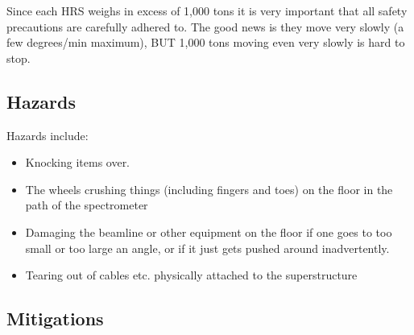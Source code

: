 %
%
Since each HRS weighs in excess of 1,000 tons it is very important that all safety
precautions are carefully adhered to. The good news is they move very slowly (a few degrees/min
maximum), BUT 1,000 tons moving even very slowly is hard to stop. 

\begin{safetyen}{0}{0}
\subsection{Hazards}

Hazards include:
\begin{itemize}
\item{Knocking items over.}
\item{The wheels crushing things (including fingers and toes) on the floor in the path of the 
spectrometer}
\item{Damaging the beamline or other equipment on the floor if one goes to too small 
or too large an angle, or if it just gets pushed around inadvertently.}
\item{Tearing out of cables etc. physically attached to the superstructure}
\end{itemize}

\subsection{Mitigations}


\end{safetyen}
